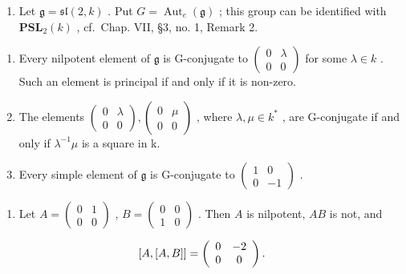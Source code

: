 
\begin{enumerate}
\def\labelenumi{\arabic{enumi})}
\tightlist
\item
  Let \(\mathfrak{g} = \mathfrak{sl}(2, k)\) . Put \(G = \operatorname{Aut}_e(\mathfrak{g})\) ; this group can be identified with \(\mathbf{PSL}_2(k)\) , cf.~Chap. VII, §3, no. 1, Remark 2.
\end{enumerate}

\begin{enumerate}
\def\labelenumi{\alph{enumi})}
\item
  Every nilpotent element of \(\mathfrak{g}\) is G-conjugate to \(\left( \begin{array}{cc}0 & \lambda \\ 0 & 0 \end{array} \right)\) for some \(\lambda \in k\) . Such an element is principal if and only if it is non-zero.
\item
  The elements \(\begin{pmatrix}0&\lambda\\0&0\end{pmatrix},\begin{pmatrix}0&\mu\\0&0\end{pmatrix}\) , where \(\lambda,\mu\in k^{*}\) , are G-conjugate if and only if \(\lambda^{-1}\mu\) is a square in k.
\item
  Every simple element of \(\mathfrak{g}\) is G-conjugate to \(\left( \begin{array}{cc}1 & 0\\ 0 & -1 \end{array} \right)\) .
\end{enumerate}

\begin{enumerate}
\def\labelenumi{\arabic{enumi})}
\setcounter{enumi}{1}
\tightlist
\item
  Let \(A = \begin{pmatrix} 0 & 1 \\ 0 & 0 \end{pmatrix}\) , \(B = \begin{pmatrix} 0 & 0 \\ 1 & 0 \end{pmatrix}\) . Then \(A\) is nilpotent, \(AB\) is not, and
\end{enumerate}

\[
[ A, [ A, B ] ] = \left( \begin{array}{c c} 0 & - 2 \\ 0 & 0 \end{array} \right).
\]

